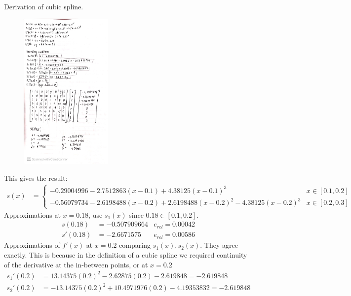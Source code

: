\documentclass[newpage]{homework}
\begin{document}
\question
Derivation of cubic spline.
\begin{figure}[htbp]
	\centering
	\includegraphics[width=0.4\textwidth]{3a.jpg}
\end{figure}
This gives the result:
\begin{align*}
	s(x)	&=	\begin{cases}
		-0.29004996 - 2.7512863(x-0.1) + 4.38125(x-0.1)^3	&	x \in [0.1,0.2]	\\
		-0.56079734 - 2.6198488(x-0.2) + 2.6198488(x-0.2)^2 - 4.38125(x-0.2)^3	&	x \in [0.2, 0.3]
	\end{cases}
\end{align*}
Approximations at $x=0.18$, use $s_1(x)$ since $0.18 \in [0.1, 0.2]$.
\begin{align*}
	s(0.18)	&=	-0.507909664
	&	e_{rel}	=	0.00042	\\
	s'(0.18)	&=	-2.6671575
	&	e_{rel}	=	0.00586
\end{align*}
Approximations of $f'(x)$ at $x=0.2$ comparing $s_1(x), s_2(x)$. They agree exactly. This is because in the definition of a cubic spline we required continuity of the derivative at the in-between points, or at $x=0.2$
\begin{align*}
	s_1'(0.2)	&=	13.14375(0.2)^2-2.62875(0.2)-2.619848
		=	-2.619848	\\
	s_2'(0.2)	&=	-13.14375(0.2)^2+10.4971976(0.2)-4.19353832
		=	-2.619848	\\
\end{align*}
\end{document}
